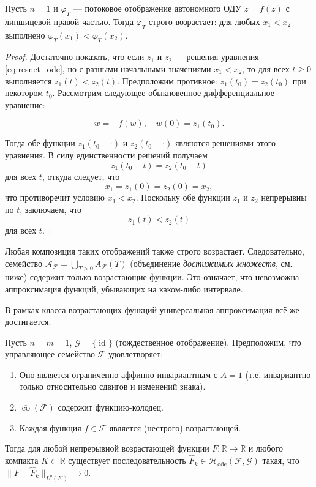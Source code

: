 \documentclass[../NDCNNAI_main.tex]{subfiles}
\begin{document}
\begin{proposition}
\label{prop:1d_monotonicity}
Пусть $n=1$ и $\varphi_T$ --- потоковое отображение автономного ОДУ $\dot{z} = f(z)$ с липшицевой правой частью. Тогда $\varphi_T$ строго возрастает: для любых $x_1 < x_2$ выполнено $\varphi_T(x_1) < \varphi_T(x_2)$.
\end{proposition}
\begin{proof}

Достаточно показать, что если \( z_1 \) и \( z_2 \) --- решения уравнения \ref{eq:resnet_ode}, но с разными начальными значениями \( x_1 < x_2 \), то для всех \( t \geq 0 \) выполняется \( z_1(t) < z_2(t) \).
Предположим противное: \( z_1(t_0) = z_2(t_0) \) при некотором \( t_0 \).
Рассмотрим следующее обыкновенное дифференциальное уравнение:

\[
\dot{w} = -f(w), \quad w(0) = z_1(t_0).
\]

Тогда обе функции \( z_1(t_0 - \cdot) \) и \( z_2(t_0 - \cdot) \) являются решениями этого уравнения. В силу единственности решений получаем
\[
z_1(t_0 - t) = z_2(t_0 - t)
\]
для всех \( t \), откуда следует, что
\[
x_1 = z_1(0) = z_2(0) = x_2,
\]
что противоречит условию \( x_1 < x_2 \). Поскольку обе функции \( z_1 \) и \( z_2 \) непрерывны по \( t \), заключаем, что
\[
z_1(t) < z_2(t)
\]
для всех \( t \).
\end{proof}

\begin{corollary}
    Любая композиция таких отображений также строго возрастает. Следовательно, семейство $\mathcal{A}_{\mathcal{F}} = \bigcup_{T>0} A_{\mathcal{F}}(T)$ (объединение \emph{достижимых множеств}, см. ниже) содержит только возрастающие функции. Это означает, что невозможна аппроксимация функций, убывающих на каком-либо интервале.
\end{corollary}

В рамках класса возрастающих функций универсальная аппроксимация всё же достигается.

\begin{theorem}
\label{thm:1d_UAT}
Пусть $n = m = 1$, $\mathcal{G} = \{\operatorname{id}\}$ (тождественное отображение). Предположим, что управляющее семейство $\mathcal{F}$ удовлетворяет:
\begin{enumerate}
    \item Оно является ограниченно аффинно инвариантным с $A=1$ (т.е. инвариантно только относительно сдвигов и изменений знака).
    \item $\overline{\operatorname{co}}(\mathcal{F})$ содержит функцию-колодец.
    \item Каждая функция $f \in \mathcal{F}$ является (нестрого) возрастающей.
\end{enumerate}
Тогда для любой непрерывной возрастающей функции $F\colon \mathbb{R} \to \mathbb{R}$ и любого компакта $K \subset \mathbb{R}$ существует последовательность $\hat{F}_k \in \mathcal{H}_{\text{ode}}(\mathcal{F}, \mathcal{G})$ такая, что $\| F - \hat{F}_k \|_{L^p(K)} \to 0$.
\end{theorem}
\end{document}
